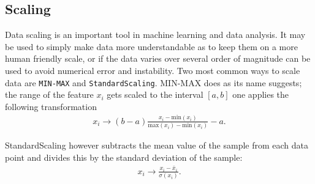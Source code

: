\documentclass[%
reprint,
amsmath,amssymb,
aps,
pra,
]{revtex4-2}
\begin{document}
\subsection{Scaling}
Data scaling is an important tool in machine learning and data analysis. It may be used to simply make data more understandable as to keep them on a more human friendly scale, or if the data varies over several order of magnitude can be used to avoid numerical error and instability. Two most common ways to scale data are \texttt{MIN-MAX} and \texttt{StandardScaling}. MIN-MAX does as its name suggests; the range of the feature $x_i$ gets scaled to the interval $[a,b]$ one applies the following transformation
\begin{align}
	x_i\to(b-a)\frac{x_i-\text{min}(x_i)}{\text{max}(x_i)-\text{min}(x_i)}-a.
\end{align}

StandardScaling however subtracts the mean value of the sample from each data point and divides this by the standard deviation of the sample:
\begin{align}
	x_i\to\frac{x_i-\bar x_i}{\sigma(x_i)}.
\end{align}
\end{document}
